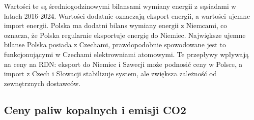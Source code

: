 \begin{table}[H]
    \centering
    \caption{Średni bilans wymiany energii z sąsiadami w latach 2016–2024}
    \label{tab:energy-trade-balance}
\end{table}

Wartości te są średniogodzinowymi bilansami wymiany energii z sąsiadami w latach 2016-2024. Wartości dodatnie oznaczają eksport energii, a wartości ujemne import energii. Polska ma dodatni bilans wymiany energii z Niemcami, co oznacza, że Polska regularnie eksportuje energię do Niemiec. Największe ujemne bilanse Polska posiada z Czechami, prawdopodobnie spowodowane jest to funkcjonującymi w Czechami elektrowniami atomowymi. Te przepływy wpływają na ceny na RDN: eksport do Niemiec i Szwecji może podnosić ceny w Polsce, a import z Czech i Słowacji stabilizuje system, ale zwiększa zależność od zewnętrznych dostawców.

\subsection{Ceny paliw kopalnych i emisji CO2}
\label{subsec:prices}

